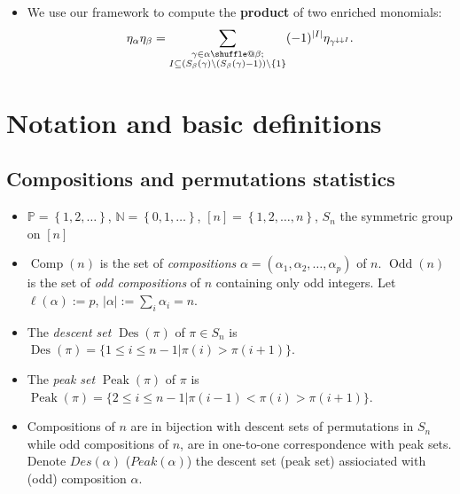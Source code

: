 \documentclass[numbers=enddot,12pt,final,onecolumn,notitlepage]{scrartcl}%
\makeatletter
\newcommand{\al}{\alpha}
\newcommand{\be}{\beta}
\newcommand{\NN}{\mathbb{N}} %
\newcommand{\PP}{\mathbb{P}} %
\newcommand{\Des}{\operatorname{Des}}
\newcommand{\Odd}{\operatorname{Odd}}
\newcommand{\Comp}{\operatorname{Comp}}
\newcommand{\Peak}{\operatorname{Peak}}
\providecommand*{\shuffle}{%
  \mathbin{\mathpalette\shuffle@{}}%
}
\newcommand*{\shuffle@}[2]{%
  \sbox0{$#1\vcenter{}$}%
  \kern .15\ht0 %
  \rlap{\vrule height .25\ht0 depth 0pt width 2.5\ht0}%
  \raise.1\ht0\hbox to 2.5\ht0{%
    \vrule height 1.75\ht0 depth -.1\ht0 width .17\ht0 %
    \hfill
    \vrule height 1.75\ht0 depth -.1\ht0 width .17\ht0 %
    \hfill
    \vrule height 1.75\ht0 depth -.1\ht0 width .17\ht0 %
  }%
  \kern .15\ht0 %
}
\newcommand{\defn}[1]{{\color{darkred}\emph{#1}}}
\newcommand{\0}{\phantom{c}}
\let\sumnonlimits\sum
\renewcommand{\sum}{\sumnonlimits\limits}
\makeatother
\begin{document}
\begin{tcolorbox}[colback=cyan!5,colframe=cyan!75!black, fonttitle=\bfseries,title=Summary of our work]
\begin{itemize}
\item We use our framework to compute the \textbf{product} of two enriched monomials:
\begin{equation*}
\eta_\al \eta_\beta
= \sum_{\substack{\gamma \in \al \shuffle \be ;\\
                   I\subseteq \left(S_{\be}(\gamma)\setminus (S_{\be}(\gamma)-1)\right) \setminus \left\{1\right\}}}
(-1)^{|I|}\eta_{\gamma^{\downarrow\downarrow I}} .
\end{equation*}
\end{itemize}
\end{tcolorbox}

\section{Notation and basic definitions}


\subsection{Compositions and permutations statistics}

\begin{itemize}
\item $\PP =\left\{1,2,\dots\right\}$, $\NN = \left\{0,1,\ldots\right\}$, $[n] = \left\{1,2,\dots, n\right\}$, $S_n$ the symmetric group on $[n]$

\item \defn{$\Comp(n)$} is the set of \defn{compositions} $\al = (\al_1, \al_2, \dots, \al_p)$ of $n$. \defn{$\Odd(n)$} is the set of \defn{odd compositions} of $n$ containing only odd integers.  Let $\ell(\al) := p$, $|\al| := \sum_i \al_i = n$.

\item The \defn{descent set} $\Des(\pi)$ of $\pi \in S_n$ is 
$\Des(\pi) = \{1\leq i\leq n-1| \pi(i)>\pi(i+1)\}.$


\item The \defn{peak set} $\Peak(\pi)$ of $\pi$ is $
\Peak(\pi) = \{2\leq i\leq n-1| \pi(i-1)<\pi(i)>\pi(i+1)\}.$

\item Compositions of $n$ are in bijection with descent sets of permutations in $S_n$ while odd compositions of $n$, are in one-to-one correspondence with peak sets. Denote \defn{$Des(\al)$} (\defn{$Peak(\al)$}) the descent set (peak set) assiociated with  (odd) composition $\al$.

\end{itemize}
\end{document}
